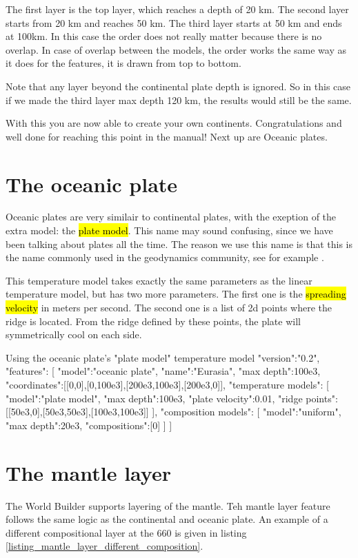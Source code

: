 \documentclass{book}
\newcommand{\WB}{{World Builder}}
\begin{document}
The first layer is the top layer, which reaches a depth of 20 km. The second layer starts from 20 km and reaches 50 km. The third layer starts at 50 km and ends at 100km. In this case the order does not really matter because there is no overlap. In case of overlap between the models, the order works the same way as it does for the features, it is drawn from top to bottom.

\begin{remark}
Note that any layer beyond the continental plate depth is ignored. So in this case if we made the third layer max depth 120 km, the results would still be the same.
\end{remark}

With this you are now able to create your own continents. Congratulations and well done for reaching this point in the manual! Next up are Oceanic plates.

\section{The oceanic plate}
Oceanic plates are very similair to continental plates, with the exeption of the extra model: the \hl{plate model}. This name may sound confusing, since we have been talking about plates all the time. The reason we use this name is that this is the name commonly used in the geodynamics community, see for example \cite{fowler2005}. 

This temperature model takes exactly the same parameters as the linear temperature model, but has two more parameters. The first one is the \hl{spreading velocity} in meters per second. The second one is a list of 2d points where the ridge is located. From the ridge defined by these points, the plate will symmetrically cool on each side.

\begin{javascriptcode}{Using the oceanic plate's "plate model" temperature model}{}
{
  "version":"0.2",
  "features":
  [
    {
      "model":"oceanic plate", "name":"Eurasia", "max depth":100e3,
      "coordinates":[[0,0],[0,100e3],[200e3,100e3],[200e3,0]],
      "temperature models":
      [
        {
          "model":"plate model", "max depth":100e3, "plate velocity":0.01,
          "ridge points":[[50e3,0],[50e3,50e3],[100e3,100e3]]
        }
      ],
      "composition models":
      [
        {"model":"uniform", "max depth":20e3, "compositions":[0]}
      ]
    }
  ]
}
\end{javascriptcode}

\section{The mantle layer}
The \WB{} supports layering of the mantle. Teh mantle layer feature follows the same logic as the continental and oceanic plate. An example of a different compositional layer at the 660 is given in listing \ref{listing_mantle_layer_different_composition}.
\end{document}
